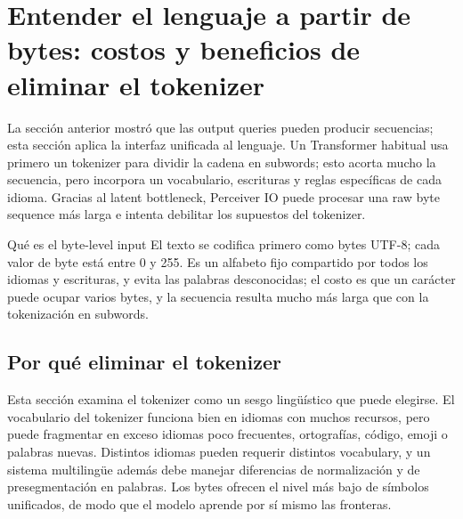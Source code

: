 \section{Entender el lenguaje a partir de bytes: costos y beneficios de eliminar el tokenizer}

La sección anterior mostró que las output queries pueden producir secuencias; esta sección aplica la interfaz unificada al lenguaje. Un Transformer habitual usa primero un tokenizer para dividir la cadena en subwords; esto acorta mucho la secuencia, pero incorpora un vocabulario, escrituras y reglas específicas de cada idioma. Gracias al latent bottleneck, Perceiver IO puede procesar una raw byte sequence más larga e intenta debilitar los supuestos del tokenizer.


\begin{knowledgebox}{Qué es el byte-level input}
El texto se codifica primero como bytes UTF-8; cada valor de byte está entre 0 y 255. Es un alfabeto fijo compartido por todos los idiomas y escrituras, y evita las palabras desconocidas; el costo es que un carácter puede ocupar varios bytes, y la secuencia resulta mucho más larga que con la tokenización en subwords.
\end{knowledgebox}

\subsection{Por qué eliminar el tokenizer}

Esta sección examina el tokenizer como un sesgo lingüístico que puede elegirse. El vocabulario del tokenizer funciona bien en idiomas con muchos recursos, pero puede fragmentar en exceso idiomas poco frecuentes, ortografías, código, emoji o palabras nuevas. Distintos idiomas pueden requerir distintos vocabulary, y un sistema multilingüe además debe manejar diferencias de normalización y de presegmentación en palabras. Los bytes ofrecen el nivel más bajo de símbolos unificados, de modo que el modelo aprende por sí mismo las fronteras.


